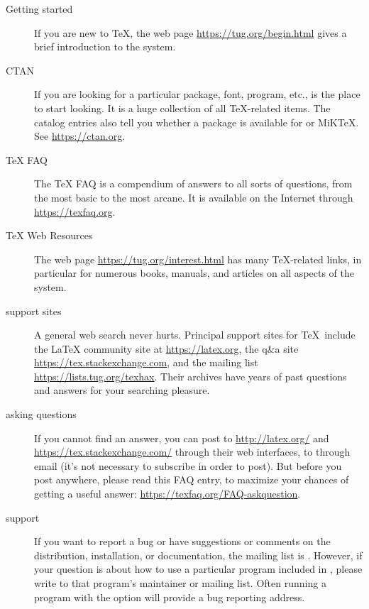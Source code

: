 \documentclass[12pt]{article}
\begin{document}
\begin{description}
\item [Getting started] If you are new to \TeX, the web page
\url{https://tug.org/begin.html} gives a brief introduction to the system.

\item [CTAN] If you are looking for a particular package, font, program,
etc., \CTAN{} is the place to start looking. It is a huge collection of
all \TeX{}-related items. The catalog entries also tell you whether a
package is available for \TL{} or MiK\TeX. See \url{https://ctan.org}.

\item [\TeX{} FAQ] The \TeX{} FAQ is a compendium of answers to all
sorts of questions, from the most basic to the most arcane. It is
available on the Internet through \url{https://texfaq.org}.

\item [\TeX{} Web Resources] The web page
\url{https://tug.org/interest.html} has many \TeX{}-related links, in
particular for numerous books, manuals, and articles on all aspects of
the system.

\item [support sites] A general web search never hurts. Principal
support sites for \TeX\ include the \LaTeX{}
community site at \url{https://latex.org}, the q\&a site
\url{https://tex.stackexchange.com}, and the mailing list
\url{https://lists.tug.org/texhax}. Their archives have years of past
questions and answers for your searching pleasure.

\item [asking questions] If you cannot find an answer, you can post to 
\url{http://latex.org/} and \url{https://tex.stackexchange.com/} through
their web interfaces, to  through email (it's not
necessary to subscribe in order to post). But before you post anywhere,
please read this FAQ entry, to maximize your chances of getting a useful
answer: \url{https://texfaq.org/FAQ-askquestion}.

\item [\TL{} support] If you want to report a bug or have
suggestions or comments on the \TL{} distribution, installation, or
documentation, the mailing list is .  However,
if your question is about how to use a particular program included in
\TL{}, please write to that program's maintainer or
mailing list.  Often running a program with the  option
will provide a bug reporting address.

\end{description}
\end{document}
